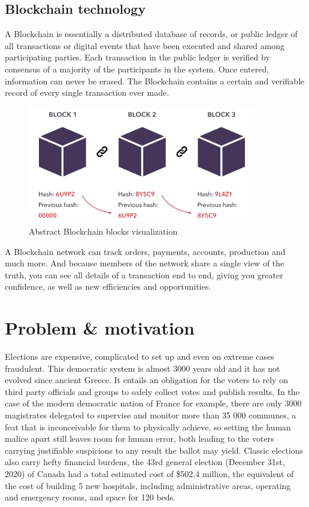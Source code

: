 \subsection{Blockchain technology}

A Blockchain is essentially a distributed database of records, or public ledger of all transactions or digital events that have been executed and shared among participating parties. Each transaction in the public ledger is verified by consensus of a majority of the participants in the system. Once entered, information can never be erased. The Blockchain contains a certain and verifiable record of every single transaction ever made\cite{michaelcrosbyBlockchainTechnologyBitcoin2016}.

\begin{figure}[h]
	\centering
		\includegraphics[width=10cm]{images/chapter1/blockchain.png}
		\caption{{\footnotesize Abstract Blockchain blocks visualization}}
\end{figure}

A Blockchain network can track orders, payments, accounts, production and much more. And because members of the network share a single view of the truth, you can see all details of a transaction end to end, giving you greater confidence, as well as new efficiencies and opportunities.\newpage

\section{Problem \& motivation}

Elections are expensive, complicated to set up and even on extreme cases fraudulent. This democratic system is almost 3000 years old and it has not evolved since ancient Greece. It entails an obligation for the voters to rely on third party officials and groups to safely collect votes and publish results, In the case of the modern democratic nation of France for example, there are only 3000 magistrates delegated to supervise and monitor more than 35 000 communes\cite{republiquefrancaiseArticleLO274Code2021}, a feat that is inconceivable for them to physically achieve, so setting the human malice apart still leaves room for human error, both leading to the voters carrying justifiable suspicions to any result the ballot may yield. Classic elections also carry hefty financial burdens, the 43rd general election (December 31st, 2020) of Canada had a total estimated cost of \$502.4 million\cite{electionscanadaEstimatedCost43rd2021}, the equivalent of the cost of building 5 new hospitals, including administrative areas, operating and emergency rooms, and space for 120 beds\cite{fixrcompanyCostBuildHospital2020}.

